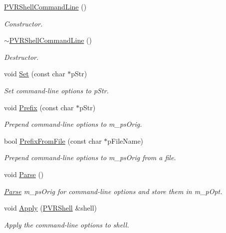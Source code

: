 \begin{DoxyCompactItemize}
\item 
\hyperlink{class_p_v_r_shell_command_line_a1568200bffdf73da490ac90671c70805}{P\+V\+R\+Shell\+Command\+Line} ()
\begin{DoxyCompactList}\small\item\em Constructor. \end{DoxyCompactList}\item 
\hyperlink{class_p_v_r_shell_command_line_a46cd5e364c1f916829546e86d0d3f6de}{$\sim$\+P\+V\+R\+Shell\+Command\+Line} ()
\begin{DoxyCompactList}\small\item\em Destructor. \end{DoxyCompactList}\item 
void \hyperlink{class_p_v_r_shell_command_line_a46200015b55e05a3ea360ee32e930354}{Set} (const char $\ast$p\+Str)
\begin{DoxyCompactList}\small\item\em Set command-\/line options to p\+Str. \end{DoxyCompactList}\item 
void \hyperlink{class_p_v_r_shell_command_line_a03939829953665e33b4d0ba2d9c6e21c}{Prefix} (const char $\ast$p\+Str)
\begin{DoxyCompactList}\small\item\em Prepend command-\/line options to m\+\_\+ps\+Orig. \end{DoxyCompactList}\item 
bool \hyperlink{class_p_v_r_shell_command_line_adabcd2f4778b487451e50c0cc75c6f47}{Prefix\+From\+File} (const char $\ast$p\+File\+Name)
\begin{DoxyCompactList}\small\item\em Prepend command-\/line options to m\+\_\+ps\+Orig from a file. \end{DoxyCompactList}\item 
void \hyperlink{class_p_v_r_shell_command_line_aed70d1cc85bc9d33b705a5efb81af363}{Parse} ()
\begin{DoxyCompactList}\small\item\em \hyperlink{struct_parse}{Parse} m\+\_\+ps\+Orig for command-\/line options and store them in m\+\_\+p\+Opt. \end{DoxyCompactList}\item 
void \hyperlink{class_p_v_r_shell_command_line_a79b2d23ee5b36d1741910aad9c4a5fd4}{Apply} (\hyperlink{class_p_v_r_shell}{P\+V\+R\+Shell} \&shell)
\begin{DoxyCompactList}\small\item\em Apply the command-\/line options to shell. \end{DoxyCompactList}\end{DoxyCompactItemize}
